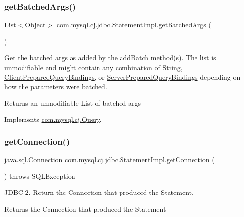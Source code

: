 \subsubsection{\texorpdfstring{get\+Batched\+Args()}{getBatchedArgs()}}
{\footnotesize\ttfamily List$<$Object$>$ com.\+mysql.\+cj.\+jdbc.\+Statement\+Impl.\+get\+Batched\+Args (\begin{DoxyParamCaption}{ }\end{DoxyParamCaption})}

Get the batched args as added by the add\+Batch method(s). The list is unmodifiable and might contain any combination of String, \mbox{\hyperlink{classcom_1_1mysql_1_1cj_1_1_client_prepared_query_bindings}{Client\+Prepared\+Query\+Bindings}}, or \mbox{\hyperlink{classcom_1_1mysql_1_1cj_1_1_server_prepared_query_bindings}{Server\+Prepared\+Query\+Bindings}} depending on how the parameters were batched.

\begin{DoxyReturn}{Returns}
an unmodifiable List of batched args 
\end{DoxyReturn}


Implements \mbox{\hyperlink{interfacecom_1_1mysql_1_1cj_1_1_query_af927782ce04741b0b0d3447e9b4f2a08}{com.\+mysql.\+cj.\+Query}}.

\mbox{\label{classcom_1_1mysql_1_1cj_1_1jdbc_1_1_statement_impl_a5e4c41ddb78ca7533f4984c9f6c996c4}} 
\subsubsection{\texorpdfstring{get\+Connection()}{getConnection()}}
{\footnotesize\ttfamily java.\+sql.\+Connection com.\+mysql.\+cj.\+jdbc.\+Statement\+Impl.\+get\+Connection (\begin{DoxyParamCaption}{ }\end{DoxyParamCaption}) throws S\+Q\+L\+Exception}

J\+D\+BC 2. Return the Connection that produced the Statement.

\begin{DoxyReturn}{Returns}
the Connection that produced the Statement
\end{DoxyReturn}

